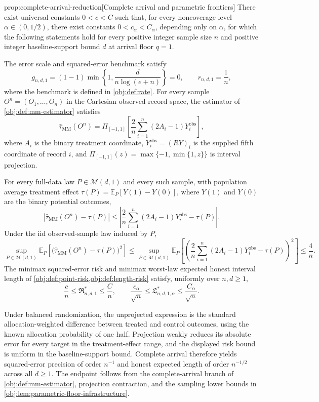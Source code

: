\begin{propositionv}{prop:complete-arrival-reduction}[Complete arrival and parametric frontiers]
There exist universal constants \(0<c<C\) such that, for every noncoverage level \(\alpha\in(0,1/2)\), there exist constants \(0<c_\alpha<C_\alpha\), depending only on \(\alpha\), for which the following statements hold for every positive integer sample size \(n\) and positive integer baseline-support bound \(d\) at arrival floor \(q=1\).

The error scale and squared-error benchmark satisfy
\[
g_{n,d,1}
=(1-1)\min\left\{1,\frac{d}{n\log(e+n)}\right\}=0,
\qquad
r_{n,d,1}=\frac1n,
\]
where the benchmark is defined in \cref{obj:def:rate}.
For every sample \(O^n=(O_1,\ldots,O_n)\) in the Cartesian observed-record space, the estimator of \cref{obj:def:mm-estimator} satisfies
\[
\widehat\tau_{\mathrm{MM}}(O^n)
=
\Pi_{[-1,1]}
\left[
\frac{2}{n}\sum_{i=1}^{n}(2A_i-1)Y_i^{\mathrm{obs}}
\right],
\]
where \(A_i\) is the binary treatment coordinate, \(Y_i^{\mathrm{obs}}=(RY)_i\) is the supplied fifth coordinate of record \(i\), and
\(\Pi_{[-1,1]}(z)=\max\{-1,\min\{1,z\}\}\) is interval projection.

For every full-data law \(P\in\mathcal M(d,1)\) and every such sample, with population average treatment effect
\(\tau(P)=\mathbb E_P[Y(1)-Y(0)]\), where \(Y(1)\) and \(Y(0)\) are the binary potential outcomes,
\[
\left|\widehat\tau_{\mathrm{MM}}(O^n)-\tau(P)\right|
\le
\left|
\frac{2}{n}\sum_{i=1}^{n}(2A_i-1)Y_i^{\mathrm{obs}}-\tau(P)
\right|.
\]
Under the iid observed-sample law induced by \(P\),
\[
\sup_{P\in\mathcal M(d,1)}
\mathbb E_P\!\left[
\bigl(\widehat\tau_{\mathrm{MM}}(O^n)-\tau(P)\bigr)^2
\right]
\le
\sup_{P\in\mathcal M(d,1)}
\mathbb E_P\!\left[
\left(
\frac{2}{n}\sum_{i=1}^{n}(2A_i-1)Y_i^{\mathrm{obs}}-\tau(P)
\right)^2
\right]
\le \frac4n.
\]
The minimax squared-error risk and minimax worst-law expected honest interval length of
\cref{obj:def:point-risk,obj:def:length-risk} satisfy, uniformly over \(n,d\ge1\),
\[
\frac{c}{n}
\le \mathfrak R^*_{n,d,1}
\le \frac{C}{n},
\qquad
\frac{c_\alpha}{\sqrt n}
\le \mathfrak L^*_{n,d,1,\alpha}
\le \frac{C_\alpha}{\sqrt n}.
\]
\end{propositionv}

Under balanced randomization, the unprojected expression is the standard allocation-weighted difference between treated and control outcomes, using the known allocation probability of one half. Projection weakly reduces its absolute error for every target in the treatment-effect range, and the displayed risk bound is uniform in the baseline-support bound. Complete arrival therefore yields squared-error precision of order \(n^{-1}\) and honest expected length of order \(n^{-1/2}\) across all \(d\ge1\). The endpoint follows from the complete-arrival branch of \cref{obj:def:mm-estimator}, projection contraction, and the sampling lower bounds in \cref{obj:lem:parametric-floor-infrastructure}.
